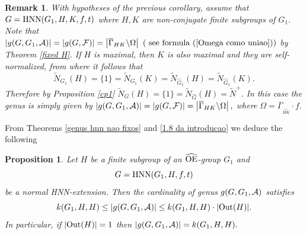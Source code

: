 \documentclass[a4paper,12pt]{article}
\newtheorem{cor}[thm]{Corollary}
\newtheorem{prop}[thm]{Proposition}
\newcommand{\A}{{\cal A}}
\newcommand{\Oe}{\rm \widehat{OE}}
\def\aut {{\rm Aut}}
\def\out {{\rm Out}}
\def\hnn {{\rm HNN}}
\newtheorem{rem}[thm]{Remark}
\begin{document}
{\begin{rem}
With hypotheses of the previous corollary, assume that $G=\hnn(G_1, H, K, f,t)$ where $H, K$ are non-conjugate finite subgroups of $G_1.$ Note that $|g(G,G_1,\A)|=|g(G,\mathcal{F})|= \left|\overline{\Gamma}_{HK}  \backslash \Omega\right|\,\,(\mbox{ see formula  } (\ref{Omega como uniao}))$ by  Theorem \ref{fixed H}. If $H$ is maximal, then $K$ is also maximal and they are self-normalized, from where it follows that $$\widetilde{N}_{G_1}(H)=\{1\}=\widetilde{N}_{G_1} (K)=\widetilde{N}_{\widehat{G}_1}(H)=\widetilde{N}_{\widehat{G}_1}(K).$$ Therefore by Proposition \ref{cp1} $\widetilde{N}_{G}(H)=\{1\}=\widetilde{N}_{\widehat{G}}(H)=\widetilde{N}^{+}.$ In this case the genus is simply given by $|g(G,G_1,\A)|=|g(G,\mathcal{F})|= \left|\overline{\Gamma}_{HK} \backslash \Omega\right|,$ where $\Omega=\overline{\Gamma}_{_{\widehat{HK}}} \cdot f.$  %
\end{rem}


From Theorems \ref{genus hnn nao fixos} and \ref{1.8 da introducao} we deduce the following

\begin{prop} \label{genus classF}
Let $H$ be a finite subgroup of an $\Oe$-group $G_1$ and $$G=\hnn(G_1, H, f, t)$$ be a normal HNN-extension. Then the cardinality of genus $g(G, G_1,\A)$ satisfies $$ k(G_1, H, H) \leq |g(G, G_1,\A)| %
\leq k(G_1, H, H) \cdot |\out(H)|.$$ In particular, if $|\out(H)|=1$ then $|g(G, G_1,\A)|=k(G_1, H, H).$ %
\end{prop}







}
\end{document}
